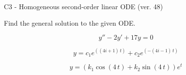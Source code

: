 \begin{exercise}
  \begin{exerciseTitle}C3 - Homogeneous second-order linear ODE (ver. 48)\end{exerciseTitle}
  \begin{exerciseStatement}
    
Find the general solution to the given ODE.

    
\[y''-2y'+17y = 0\]

  \end{exerciseStatement}
  \begin{exerciseAnswer}
    
\[y= c_{1} e^{\left(\left(4 i + 1\right) \, t\right)} + c_{2} e^{\left(-\left(4 i - 1\right) \, t\right)}\]

    
\[y= {\left(k_{1} \cos\left(4 \, t\right) + k_{2} \sin\left(4 \, t\right)\right)} e^{t}\]

  \end{exerciseAnswer}
\end{exercise}